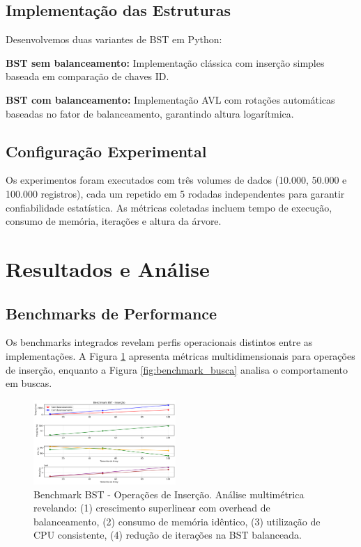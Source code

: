 \documentclass[conference]{IEEEtran}
\begin{document}
\subsection{Implementação das Estruturas}
Desenvolvemos duas variantes de BST em Python:

\textbf{BST sem balanceamento:} Implementação clássica com inserção simples baseada em comparação de chaves ID.

\textbf{BST com balanceamento:} Implementação AVL com rotações automáticas baseadas no fator de balanceamento, garantindo altura logarítmica.

\subsection{Configuração Experimental}
Os experimentos foram executados com três volumes de dados (10.000, 50.000 e 100.000 registros), cada um repetido em 5 rodadas independentes para garantir confiabilidade estatística. As métricas coletadas incluem tempo de execução, consumo de memória, iterações e altura da árvore.

\section{Resultados e Análise}

\subsection{Benchmarks de Performance}
Os benchmarks integrados revelam perfis operacionais distintos entre as implementações. A Figura \ref{fig:benchmark_insercao} apresenta métricas multidimensionais para operações de inserção, enquanto a Figura \ref{fig:benchmark_busca} analisa o comportamento em buscas.

\begin{figure}[htbp]
\centerline{\includegraphics[width=0.48\textwidth]{benchmark_bst_insercao.png}}
\caption{Benchmark BST - Operações de Inserção. Análise multimétrica revelando: (1) crescimento superlinear com overhead de balanceamento, (2) consumo de memória idêntico, (3) utilização de CPU consistente, (4) redução de iterações na BST balanceada.}
\label{fig:benchmark_insercao}
\end{figure}
\end{document}
